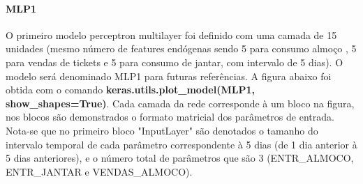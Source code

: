 \documentclass[	12pt, Times, openright, twoside, a4paper, english, brazil]{abntex2}
\begin{document}
              \paragraph{MLP1}
    	        O primeiro modelo perceptron multilayer foi definido com uma camada de 15 unidades (mesmo número de features endógenas sendo 5 para consumo almoço , 5 para vendas de tickets e 5 para consumo de jantar, com intervalo de 5 dias).
    	        O modelo será denominado MLP1 para futuras referências. A figura abaixo foi obtida com o comando \textbf{keras.utils.plot\_model(MLP1, show\_shapes=True)}. Cada camada da rede corresponde à um bloco na figura, nos blocos são demonstrados o formato matricial dos parâmetros de  entrada. Nota-se que no primeiro bloco "InputLayer" são denotados o tamanho do intervalo temporal de cada parâmetro correspondente à 5 dias (de 1 dia anterior à 5 dias anteriores), e o número total de parâmetros que são 3 (ENTR\_ALMOCO, ENTR\_JANTAR e VENDAS\_ALMOCO).
    	        \begin{figure}[H]
                \end{figure}
                \begin{figure}[H]
                \end{figure}
    	        
\end{document}
